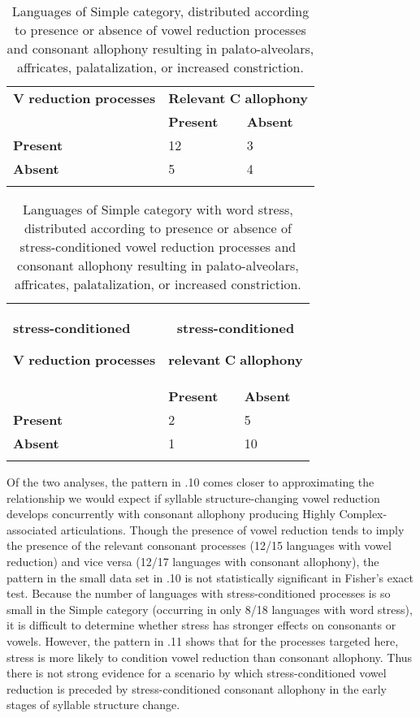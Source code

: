 \begin{table}
\begin{tabularx}{\textwidth}{XXX}
\lsptoprule
 \textbf{V} \textbf{reduction} \textbf{processes} & \multicolumn{2}{c}{ \textbf{Relevant} \textbf{C} \textbf{allophony}}\\
\hhline{-~~} & \textbf{Present} & \textbf{Absent}\\
 \textbf{Present} & 12 & 3\\
 \textbf{Absent} & 5 & 4\\
\lspbottomrule
\end{tabularx}
\caption{\label{7.10}Languages of Simple category, distributed according to presence or absence of vowel reduction processes and consonant allophony resulting in palato-alveolars, affricates, palatalization, or increased constriction.}
\end{table}




\begin{table}
\begin{tabularx}{\textwidth}{XXX}
\lsptoprule
{ \textbf{stress-conditioned}}

 \textbf{V} \textbf{reduction} \textbf{processes} & \multicolumn{2}{c}{{ \textbf{stress-conditioned} }

 \textbf{relevant} \textbf{C} \textbf{allophony}}\\
\hhline{-~~} & \textbf{Present} & \textbf{Absent}\\
 \textbf{Present} & 2 & 5\\
 \textbf{Absent} & 1 & 10\\
\lspbottomrule
\end{tabularx}
\caption{\label{7.11}Languages of Simple category with word stress, distributed according to presence or absence of stress-conditioned vowel reduction processes and consonant allophony resulting in palato-alveolars, affricates, palatalization, or increased constriction.}
\end{table}

  Of the two analyses, the pattern in .10 comes closer to approximating the relationship we would expect if syllable structure-changing vowel reduction develops concurrently with consonant allophony producing Highly Complex-associated articulations. Though the presence of vowel reduction tends to imply the presence of the relevant consonant processes (12/15 languages with vowel reduction) and vice versa (12/17 languages with consonant allophony), the pattern in the small data set in .10 is not statistically significant in Fisher’s exact test. Because the number of languages with stress-conditioned processes is so small in the Simple category (occurring in only 8/18 languages with word stress), it is difficult to determine whether stress has stronger effects on consonants or vowels. However, the pattern in .11 shows that for the processes targeted here, stress is more likely to condition vowel reduction than consonant allophony. Thus there is not strong evidence for a scenario by which stress-conditioned vowel reduction is preceded by stress-conditioned consonant allophony in the early stages of syllable structure change.

